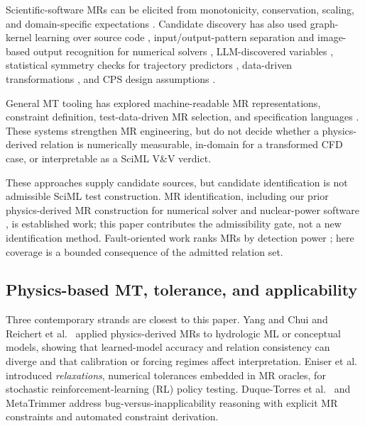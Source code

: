 \documentclass[preprint,12pt,authoryear]{elsarticle}
\begin{document}
Scientific-software MRs can be elicited from monotonicity, conservation, scaling, and domain-specific expectations \citep{kanewalaBieman2014slr,kanewala2019scientific,lin2020exploratory,olsen2019simulation,raunak2021continuum}. Candidate discovery has also used graph-kernel learning over source code \citep{kanewala2016graphkernel}, input/output-pattern separation and image-based output recognition for numerical solvers \citep{wang2022mridentification,fu2021burnup}, LLM-discovered variables \citep{tsigkanos2023}, statistical symmetry checks for trajectory predictors \citep{spieker2024trajectory,spieker2025multimodal}, data-driven transformations \citep{hiremath2021ocean}, and CPS design assumptions \citep{mandrioli2025cps}.

General MT tooling has explored machine-readable MR representations, constraint definition, test-data-driven MR selection, and specification languages \citep{duqueTorres2023completePipeline,duqueTorres2024selecting,sun2026ccml}. These systems strengthen MR engineering, but do not decide whether a physics-derived relation is numerically measurable, in-domain for a transformed CFD case, or interpretable as a SciML V\&V verdict.

These approaches supply candidate sources, but candidate identification is not admissible SciML test construction. MR identification, including our prior physics-derived MR construction for numerical solver and nuclear-power software \citep{li2022nuclearmr,wang2022mridentification}, is established work; this paper contributes the admissibility gate, not a new identification method. Fault-oriented work ranks MRs by detection power \citep{srinivasan2022prioritization,saha2019faultdetection}; here coverage is a bounded consequence of the admitted relation set.

\subsection{Physics-based MT, tolerance, and applicability}
\label{subsec:physics-mt}

Three contemporary strands are closest to this paper. Yang and Chui \citep{yang2021hydromt} and Reichert et al.~\citep{reichert2024hess} applied physics-derived MRs to hydrologic ML or conceptual models, showing that learned-model accuracy and relation consistency can diverge and that calibration or forcing regimes affect interpretation. Eniser et al.~\citep{eniser2022relaxations} introduced \emph{relaxations}, numerical tolerances embedded in MR oracles, for stochastic reinforcement-learning (RL) policy testing. Duque-Torres et al.~\citep{duqueTorres2023bugornot,duqueTorres2023completePipeline,duqueTorres2024selecting} and MetaTrimmer \citep{duqueTorres2023metaTrimmer} address bug-versus-inapplicability reasoning with explicit MR constraints and automated constraint derivation.
\end{document}
